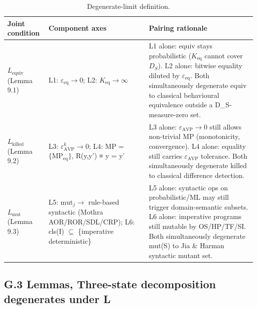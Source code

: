 \documentclass[acmsmall,screen,review]{acmart}
\begin{document}
{\def\LTcaptype{table} %
\begin{longtable}[]{@{}
  >{\raggedright\arraybackslash}p{}
  >{\raggedright\arraybackslash}p{}
  >{\raggedright\arraybackslash}p{}@{}}
\caption{Degenerate-limit definition.}\label{tab:p2-29}\\
\toprule\noalign{}
\begin{minipage}[b]{\linewidth}\raggedright
Joint condition
\end{minipage} & \begin{minipage}[b]{\linewidth}\raggedright
Component axes
\end{minipage} & \begin{minipage}[b]{\linewidth}\raggedright
Pairing rationale
\end{minipage} \\
\midrule\noalign{}
\endfirsthead
\endhead
\bottomrule\noalign{}
\endlastfoot
\textbf{$L_{\mathrm{equiv}}$} (Lemma 9.1) & L1: $\varepsilon_{\mathrm{eq}} \to 0$; L2: $K_{\mathrm{eq}} \to \infty$ & L1 alone:
equiv stays probabilistic ($K_{\mathrm{eq}}$ cannot cover $D_S$). L2 alone: bitwise
equality diluted by $\varepsilon_{\mathrm{eq}}$. Both simultaneously degenerate equiv to
classical behavioural equivalence outside a D\_S-measure-zero set. \\
\textbf{$L_{\mathrm{killed}}$} (Lemma 9.2) & L3: $\varepsilon_{\mathrm{AVP}}^k \to 0$; L4: MP =
$\{\mathrm{MP}_{\mathrm{eq}}\}$, R(y,y') ≡ y = y' & L3 alone: $\varepsilon_{\mathrm{AVP}} \to 0$ still allows
non-trivial MP (monotonicity, convergence). L4 alone: equality still
carries $\varepsilon_{\mathrm{AVP}}$ tolerance. Both simultaneously degenerate killed to
classical difference detection. \\
\textbf{$L_{\mathrm{mut}}$} (Lemma 9.3) & L5: $\mathrm{mut}_j \to$ rule-based syntactic (Mothra
AOR/ROR/SDL/CRP); L6: cls(I) $\subseteq$ \{imperative deterministic\} & L5 alone:
syntactic ops on probabilistic/ML may still trigger domain-semantic
subsets. L6 alone: imperative programs still mutable by OS/HP/TF/SI.
Both simultaneously degenerate mut(S) to Jia \& Harman syntactic mutant
set. \\
\end{longtable}
}

\subsection{G.3 Lemmas, Three-state decomposition degenerates under L}\label{g.3-lemmas-three-state-decomposition-degenerates-under-l}
\end{document}
